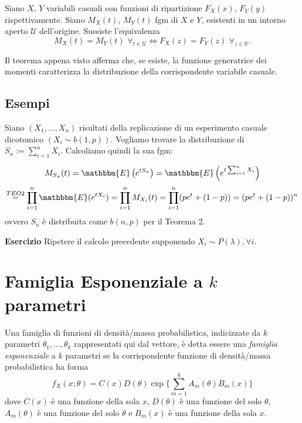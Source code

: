 \begin{thm}
Siano \(X\), \(Y\) variabili casuali con funzioni di ripartizione \(F_X(x)\), \(F_Y(y)\) rispettivamente.
Siano \(M_X(t)\), \(M_Y(t)\) fgm di \(X\) e \(Y\), esistenti in un intorno aperto \(\mathcal{U}\) dell'origine. Sussiste l'equivalenza
\begin{equation}
  M_X(t) = M_Y(t) \,\,\forall_{t \in \mathcal{U}} \iff
  F_X(z) = F_Y(z) \,\,\forall_{z \in \mathbb{R}}.
\end{equation}
\end{thm}

\begin{oss}
Il teorema appena visto afferma che, se esiste, la funzione generatrice dei momenti caratterizza la distribuzione della corrispondente variabile casuale.
\end{oss}

\subsection{Esempi}

\begin{ese}
Siano $(X_1,...,X_n)$ risultati della replicazione di un esperimento casuale dicotomico $(X_i \sim b(1,p))$. Vogliamo trovare la distribuzione di $S_n := \displaystyle\sum_{i=1}^n X_i$. Calcoliamo quindi la sua fgm:

$$M_{S_n}(t) = \mathbbm{E} \left( {e^{t S_n}} \right)  = \mathbbm{E} \left( {e^{t \sum_{i=1}^n X_i}} \right) $$
$$\stackrel{TEO 2}
{=} \displaystyle\prod_{i=1}^n \mathbbm{E}({e^{tX_i}}) = \displaystyle\prod_{i=1}^n M_{X_i}(t) = \displaystyle\prod_{i=1}^n (p e^t + (1-p)) = (p e^t + (1-p))^n$$ ovvero $S_n$ è distribuita come $b(n,p)$ per il Teorema 2.
\end{ese}

\noindent \textbf{Esercizio}
Ripetere il calcolo precedente supponendo $X_i \sim P(\lambda), \forall i$.

\section{Famiglia Esponenziale a \(k\) parametri}

Una famiglia di funzioni di densità/massa probabilistica, indicizzate da \(k\)
parametri \(\theta_1,\dotsc,\theta_k\) rappresentati qui dal vettore, è detta essere una \emph{famiglia esponenziale} a \(k\) parametri se la corrispondente funzione di densità/massa probabilistica ha forma
\begin{equation}
  f_X(x;\theta) = C(x)D(\theta)
                  \exp\lbrace\sum_{m=1}^k A_m(\theta) B_m(x)\rbrace
\end{equation}
dove \(C(x)\) è una funzione della sola \(x\), \(D(\theta)\) è una funzione del solo \(\theta\), $A_m(\theta)$ è una funzione del solo \(\theta\) e \(B_m(x)\) è una funzione della sola \(x\).

